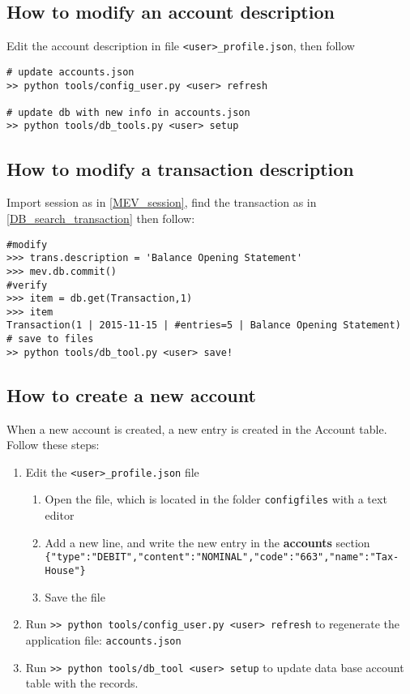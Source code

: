 \documentclass[12pt, a4paper]{article}
\begin{document}
\subsection{How to modify an account description}
Edit the account description in file \verb!<user>_profile.json!, then follow
\begin{verbatim}
# update accounts.json
>> python tools/config_user.py <user> refresh

# update db with new info in accounts.json
>> python tools/db_tools.py <user> setup
\end{verbatim}

\subsection{How to modify a transaction description}
Import session as in \ref{MEV_session}, find the transaction as in \ref{DB_search_transaction} then follow:
\begin{verbatim}
#modify
>>> trans.description = 'Balance Opening Statement'
>>> mev.db.commit()
#verify
>>> item = db.get(Transaction,1)
>>> item
Transaction(1 | 2015-11-15 | #entries=5 | Balance Opening Statement)
# save to files
>> python tools/db_tool.py <user> save!
\end{verbatim}
 
 
 \subsection{How to create a new account}  
 When a new account is created, a new entry is created in the Account table. 
 Follow these steps:
 \begin{enumerate}
 \item Edit the \verb!<user>_profile.json! file
 \begin{enumerate}
 \item Open the file, which is located in the folder \verb!configfiles! with a text editor
 \item Add a new line, and  write the new entry in the \textbf{accounts} section\\ 
 	\verb!{"type":"DEBIT","content":"NOMINAL","code":"663","name":"Tax-House"}!
\item Save the file
\end{enumerate}
\item Run \verb!>> python tools/config_user.py <user> refresh! to regenerate the application file: \verb!accounts.json!
\item Run \verb!>> python tools/db_tool <user> setup! to  update data base account table with the records. 
 \end{enumerate}
 
\end{document}
